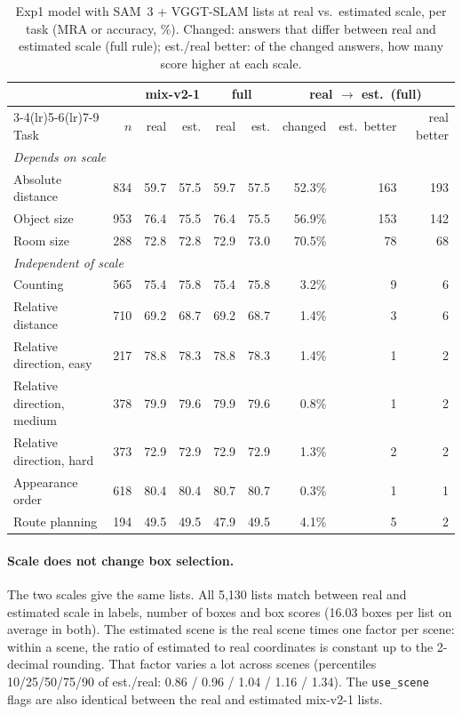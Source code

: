 \begin{table}[h]
\centering
\caption{Exp1 model with SAM~3 + VGGT-SLAM lists at real vs.\ estimated scale, per task (MRA or accuracy, \%).
Changed: answers that differ between real and estimated scale (full rule); est./real better: of the changed answers, how many
score higher at each scale.}
\label{tab:scale}
\small
\begin{tabular}{lrrrrrrrr}
\toprule
 & & \multicolumn{2}{c}{mix-v2-1} & \multicolumn{2}{c}{full} & \multicolumn{3}{c}{real $\rightarrow$ est.\ (full)} \\
\cmidrule(lr){3-4}\cmidrule(lr){5-6}\cmidrule(lr){7-9}
Task & $n$ & real & est. & real & est. & changed & est.\ better & real better \\
\midrule
\multicolumn{9}{l}{\emph{Depends on scale}} \\
Absolute distance & 834 & 59.7 & 57.5 & 59.7 & 57.5 & 52.3\% & 163 & 193 \\
Object size       & 953 & 76.4 & 75.5 & 76.4 & 75.5 & 56.9\% & 153 & 142 \\
Room size         & 288 & 72.8 & 72.8 & 72.9 & 73.0 & 70.5\% & 78 & 68 \\
\midrule
\multicolumn{9}{l}{\emph{Independent of scale}} \\
Counting                   & 565 & 75.4 & 75.8 & 75.4 & 75.8 & 3.2\% & 9 & 6 \\
Relative distance          & 710 & 69.2 & 68.7 & 69.2 & 68.7 & 1.4\% & 3 & 6 \\
Relative direction, easy   & 217 & 78.8 & 78.3 & 78.8 & 78.3 & 1.4\% & 1 & 2 \\
Relative direction, medium & 378 & 79.9 & 79.6 & 79.9 & 79.6 & 0.8\% & 1 & 2 \\
Relative direction, hard   & 373 & 72.9 & 72.9 & 72.9 & 72.9 & 1.3\% & 2 & 2 \\
Appearance order           & 618 & 80.4 & 80.4 & 80.7 & 80.7 & 0.3\% & 1 & 1 \\
Route planning             & 194 & 49.5 & 49.5 & 47.9 & 49.5 & 4.1\% & 5 & 2 \\
\bottomrule
\end{tabular}
\end{table}

\paragraph{Scale does not change box selection.}
The two scales give the same lists. All 5,130 lists match between real and estimated scale in labels, number of boxes and
box scores (16.03 boxes per list on average in both). The estimated scene is the real scene times one factor per scene:
within a scene, the ratio of estimated to real coordinates is constant up to the 2-decimal rounding. That factor varies a lot
across scenes (percentiles 10/25/50/75/90 of est./real: 0.86 / 0.96 / 1.04 / 1.16 / 1.34). The \texttt{use\_scene} flags are
also identical between the real and estimated mix-v2-1 lists.

